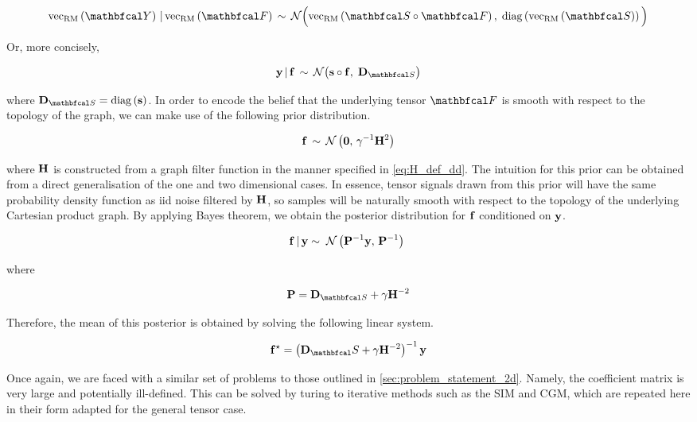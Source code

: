 \begin{equation}
    \vecrm{\Yt} \, | \, \vecrm{\Ft} \, \sim \, \mathcal{N}\Big(\vecrm{\St \circ \Ft}, \; \diag{\vecrm{\St}}\Big)
\end{equation}

Or, more concisely, 

\begin{equation}
    \y \, | \, \f \, \sim \, \mathcal{N}\big(\s \circ \f, \; \D_{\St} \big)
\end{equation}

where $\D_{\St} = \diag{\s}$. In order to encode the belief that the underlying tensor $\Ft$ is smooth with respect to the topology of the graph, we can make use of the following prior distribution. 

\begin{equation}
    \mathbf{f} \, \sim \, \mathcal{N}\left( \mathbf{0}, \, \gamma^{-1} \mathbf{H}^2 \right) 
\end{equation}

where $\mathbf{H}$ is constructed from a graph filter function in the manner specified in \cref{eq:H_def_dd}. The intuition for this prior can be obtained from a direct generalisation of the one and two dimensional cases. In essence, tensor signals drawn from this prior will have the same probability density function as iid noise filtered by $\mathbf{H}$, so samples will be naturally smooth with respect to the topology of the underlying Cartesian product graph. By applying Bayes theorem, we obtain the posterior distribution for $\mathbf{f}$ conditioned on $\mathbf{y}$. 


\begin{equation}
    \mathbf{f} \, | \, \mathbf{y} \sim \; \mathcal{N}\left(\mathbf{P}^{-1} \mathbf{y}, \, \mathbf{P}^{-1}\right) \;
\end{equation}

where 

\begin{equation}
    \PP = \D_{\St} + \gamma \HH^{-2}
\end{equation}

Therefore, the mean of this posterior is obtained by solving the following linear system.

\begin{equation}
    \label{eq:lin_system_dd}
    \f^{\star} = \left(\D_\St + \gamma \HH^{-2}\right)^{-1} \y
\end{equation}

Once again, we are faced with a similar set of problems to those outlined in \cref{sec:problem_statement_2d}. Namely, the coefficient matrix is very large and potentially ill-defined. This can be solved by turing to iterative methods such as the SIM and CGM, which are repeated here in their form adapted for the general tensor case. 

